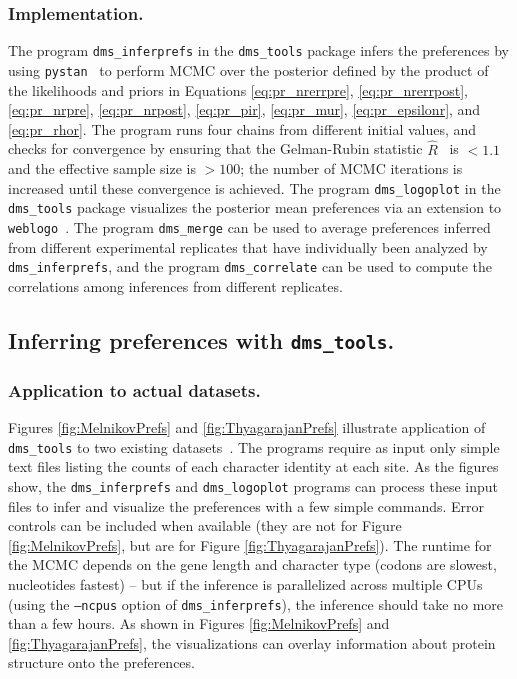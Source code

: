 \documentclass[twocolumn]{bmcart}%
\begin{document}
\subsubsection*{Implementation.}
The program \texttt{dms\_inferprefs} in the \texttt{dms\_tools} package infers the preferences by using \texttt{pystan}~\cite{pystan-software:2014} to perform MCMC over the posterior defined by the product of the likelihoods and priors in Equations \ref{eq:pr_nrerrpre}, \ref{eq:pr_nrerrpost}, \ref{eq:pr_nrpre}, \ref{eq:pr_nrpost}, \ref{eq:pr_pir}, \ref{eq:pr_mur}, \ref{eq:pr_epsilonr}, and \ref{eq:pr_rhor}. The program runs four chains from different initial values, and checks for convergence by ensuring that the Gelman-Rubin statistic $\hat{R}$~\cite{gelman1992inference} is $<1.1$ and the effective sample size is $>100$; the number of MCMC iterations is increased until these convergence is achieved. The program \texttt{dms\_logoplot} in the \texttt{dms\_tools} package visualizes the posterior mean preferences via an extension to \texttt{weblogo}~\cite{crooks2004}. The program \texttt{dms\_merge} can be used to average preferences inferred from different experimental replicates that have individually been analyzed by \texttt{dms\_inferprefs}, and the program \texttt{dms\_correlate} can be used to compute the correlations among inferences from different replicates.

\subsection*{Inferring preferences with \texttt{dms\_tools}.}

\subsubsection*{Application to actual datasets.}
Figures \ref{fig:MelnikovPrefs} and \ref{fig:ThyagarajanPrefs} illustrate application of \texttt{dms\_tools} to two existing datasets~\cite{melnikov2014comprehensive,thyagarajan2014inherent}. The programs require as input only simple text files listing the counts of each character identity at each site. As the figures show, the \texttt{dms\_inferprefs} and \texttt{dms\_logoplot} programs can process these input files to infer and visualize the preferences with a few simple commands. Error controls can be included when available (they are not for Figure \ref{fig:MelnikovPrefs}, but are for Figure \ref{fig:ThyagarajanPrefs}). The runtime for the MCMC depends on the gene length and character type (codons are slowest, nucleotides fastest) -- but if the inference is parallelized across multiple CPUs (using the \texttt{--ncpus} option of \texttt{dms\_inferprefs}), the inference should take no more than a few hours. As shown in Figures \ref{fig:MelnikovPrefs} and \ref{fig:ThyagarajanPrefs}, the visualizations can overlay information about protein structure onto the preferences.
\end{document}

